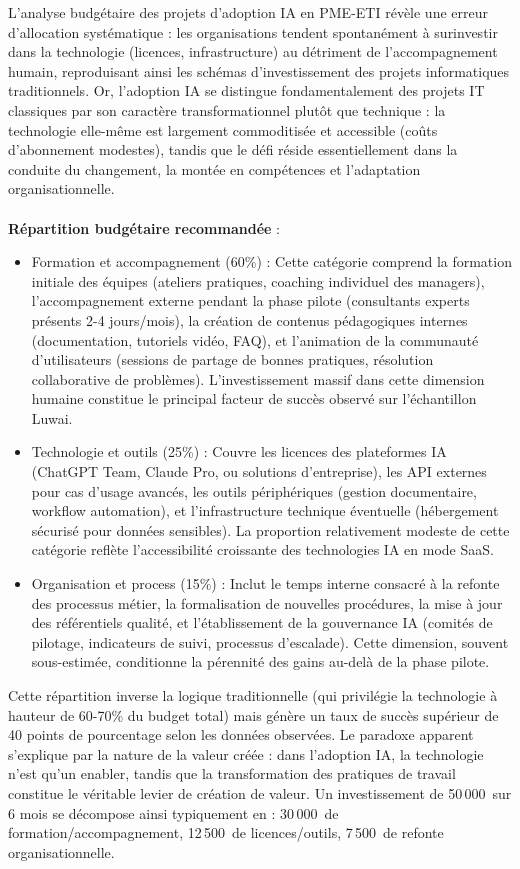 L'analyse budgétaire des projets d'adoption IA en PME-ETI révèle une erreur d'allocation systématique : les organisations tendent spontanément à surinvestir dans la technologie (licences, infrastructure) au détriment de l'accompagnement humain, reproduisant ainsi les schémas d'investissement des projets informatiques traditionnels. Or, l'adoption IA se distingue fondamentalement des projets IT classiques par son caractère transformationnel plutôt que technique : la technologie elle-même est largement commoditisée et accessible (coûts d'abonnement modestes), tandis que le défi réside essentiellement dans la conduite du changement, la montée en compétences et l'adaptation organisationnelle.
\\\\
\textbf{Répartition budgétaire recommandée} :
\begin{itemize}
    \item Formation et accompagnement (60\%) : Cette catégorie comprend la formation initiale des équipes (ateliers pratiques, coaching individuel des managers), l'accompagnement externe pendant la phase pilote (consultants experts présents 2-4 jours/mois), la création de contenus pédagogiques internes (documentation, tutoriels vidéo, FAQ), et l'animation de la communauté d'utilisateurs (sessions de partage de bonnes pratiques, résolution collaborative de problèmes). L'investissement massif dans cette dimension humaine constitue le principal facteur de succès observé sur l'échantillon Luwai.
    
    \item Technologie et outils (25\%) : Couvre les licences des plateformes IA (ChatGPT Team, Claude Pro, ou solutions d'entreprise), les API externes pour cas d'usage avancés, les outils périphériques (gestion documentaire, workflow automation), et l'infrastructure technique éventuelle (hébergement sécurisé pour données sensibles). La proportion relativement modeste de cette catégorie reflète l'accessibilité croissante des technologies IA en mode SaaS.
    
    \item Organisation et process (15\%) : Inclut le temps interne consacré à la refonte des processus métier, la formalisation de nouvelles procédures, la mise à jour des référentiels qualité, et l'établissement de la gouvernance IA (comités de pilotage, indicateurs de suivi, processus d'escalade). Cette dimension, souvent sous-estimée, conditionne la pérennité des gains au-delà de la phase pilote.
\end{itemize}
\medskip
Cette répartition inverse la logique traditionnelle (qui privilégie la technologie à hauteur de 60-70\% du budget total) mais génère un taux de succès supérieur de 40 points de pourcentage selon les données observées. Le paradoxe apparent s'explique par la nature de la valeur créée : dans l'adoption IA, la technologie n'est qu'un enabler, tandis que la transformation des pratiques de travail constitue le véritable levier de création de valeur. Un investissement de 50\,000\,\texteuro{} sur 6 mois se décompose ainsi typiquement en : 30\,000\,\texteuro{} de formation/accompagnement, 12\,500\,\texteuro{} de licences/outils, 7\,500\,\texteuro{} de refonte organisationnelle.

